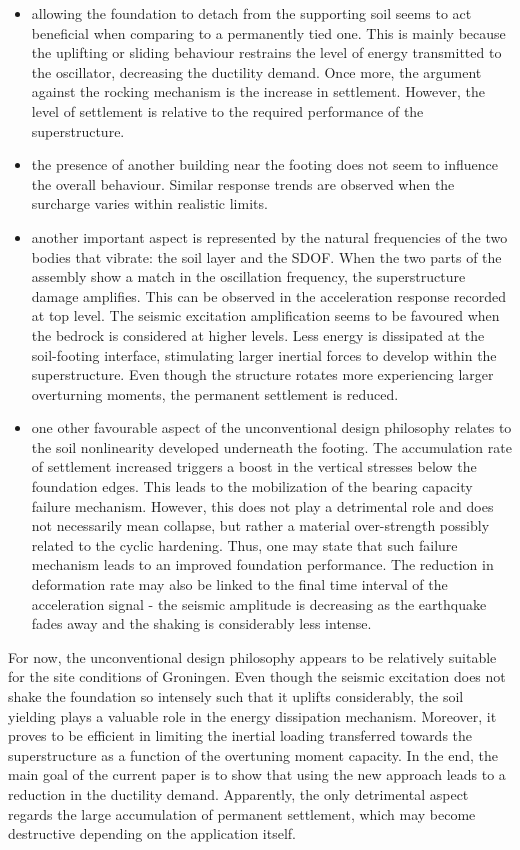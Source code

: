 \begin{itemize}
	\item allowing the foundation to detach from the supporting soil seems to act beneficial when comparing to a permanently tied one. This is mainly because the uplifting or sliding behaviour restrains the level of energy transmitted to the oscillator, decreasing the ductility demand. Once more, the argument against the rocking mechanism is the increase in settlement. However, the level of settlement is relative to the required performance of the superstructure.
	\item the presence of another building near the footing does not seem to influence the overall behaviour. Similar response trends are observed when the surcharge varies within realistic limits.
	\item another important aspect is represented by the natural frequencies of the two bodies that vibrate: the soil layer and the SDOF. When the two parts of the assembly show a match in the oscillation frequency, the superstructure damage amplifies. This can be observed in the acceleration response recorded at top level. The seismic excitation amplification seems to be favoured when the bedrock is considered at higher levels. Less energy is dissipated at the soil-footing interface, stimulating larger inertial forces to develop within the superstructure. Even though the structure rotates more experiencing larger overturning moments, the permanent settlement is reduced.
	\item one other favourable aspect of the unconventional design philosophy relates to the soil nonlinearity developed underneath the footing. The accumulation rate of settlement increased triggers a boost in the vertical stresses below the foundation edges. This leads to the mobilization of the bearing capacity failure mechanism. However, this does not play a detrimental role and does not necessarily mean collapse, but rather a material over-strength possibly related to the cyclic hardening. Thus, one may state that such failure mechanism leads to an improved foundation performance. The reduction in deformation rate may also be linked to the final time interval of the acceleration signal - the seismic amplitude is decreasing as the earthquake fades away and the shaking is considerably less intense. 
\end{itemize}


For now, the unconventional design philosophy appears to be relatively suitable for the site conditions of Groningen. Even though the seismic excitation does not shake the foundation so intensely such that it uplifts considerably, the soil yielding plays a valuable role in the energy dissipation mechanism. Moreover, it proves to be efficient in limiting the inertial loading transferred towards the superstructure as a function of the overtuning moment capacity. In the end, the main goal of the current paper is to show that using the new approach leads to a reduction in the ductility demand. Apparently, the only detrimental aspect regards the large accumulation of permanent settlement, which may become destructive depending on the application itself.

